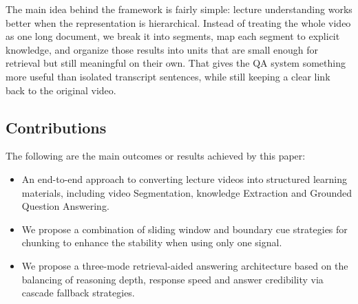 The main idea behind the framework is fairly simple: lecture understanding works better when the representation is hierarchical. Instead of treating the whole video as one long document, we break it into segments, map each segment to explicit knowledge, and organize those results into units that are small enough for retrieval but still meaningful on their own. That gives the QA system something more useful than isolated transcript sentences, while still keeping a clear link back to the original video.

\subsection{Contributions}

The following are the main outcomes or results achieved by this paper:

\begin{itemize}
\item An end-to-end approach to converting lecture videos into structured learning materials, including video Segmentation, knowledge Extraction and Grounded Question Answering.
\item We propose a combination of sliding window and boundary cue strategies for chunking to enhance the stability when using only one signal.
\item We propose a three-mode retrieval-aided answering architecture based on the balancing of reasoning depth, response speed and answer credibility via cascade fallback strategies.
\end{itemize}
